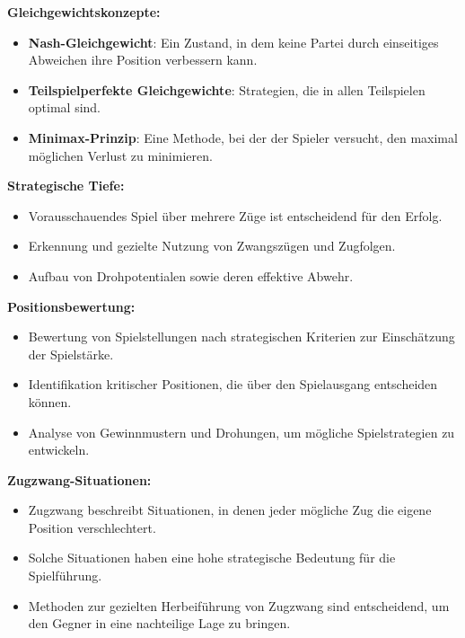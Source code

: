 \textbf{Gleichgewichtskonzepte:}
\begin{itemize}
	\item \textbf{Nash-Gleichgewicht}: Ein Zustand, in dem keine Partei durch einseitiges Abweichen ihre Position verbessern kann.
	\item \textbf{Teilspielperfekte Gleichgewichte}: Strategien, die in allen Teilspielen optimal sind.
	\item \textbf{Minimax-Prinzip}: Eine Methode, bei der der Spieler versucht, den maximal möglichen Verlust zu minimieren.
\end{itemize}

\textbf{Strategische Tiefe:}
\begin{itemize}
	\item Vorausschauendes Spiel über mehrere Züge ist entscheidend für den Erfolg.
	\item Erkennung und gezielte Nutzung von Zwangszügen und Zugfolgen.
	\item Aufbau von Drohpotentialen sowie deren effektive Abwehr.
\end{itemize}

\textbf{Positionsbewertung:}
\begin{itemize}
	\item Bewertung von Spielstellungen nach strategischen Kriterien zur Einschätzung der Spielstärke.
	\item Identifikation kritischer Positionen, die über den Spielausgang entscheiden können.
	\item Analyse von Gewinnmustern und Drohungen, um mögliche Spielstrategien zu entwickeln.
\end{itemize}

\textbf{Zugzwang-Situationen:}
\begin{itemize}
	\item Zugzwang beschreibt Situationen, in denen jeder mögliche Zug die eigene Position verschlechtert.
	\item Solche Situationen haben eine hohe strategische Bedeutung für die Spielführung.
	\item Methoden zur gezielten Herbeiführung von Zugzwang sind entscheidend, um den Gegner in eine nachteilige Lage zu bringen.
\end{itemize}
